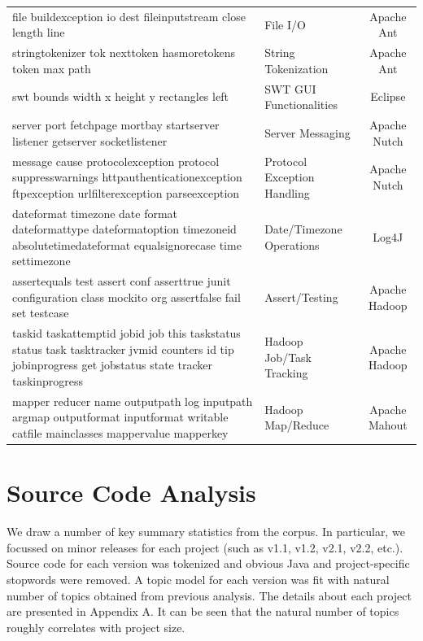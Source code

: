 \documentclass[12pt]{article}
\begin{document}
\begin{center}
\begin{longtable}{|>{\small}m{7.1cm}|>{\small}m{3cm}|>{\small}c|}
\hline
\multicolumn{1}{|c|}{Top Words} & \multicolumn{1}{|c|}{Topic} & \multicolumn{1}{|c|}{Project} \\ \hline
\endhead
file buildexception io dest fileinputstream close length line & File I/O & Apache Ant \\ \hline
stringtokenizer tok nexttoken hasmoretokens token max path & String Tokenization & Apache Ant \\ \hline
swt bounds width x height y rectangles left & SWT GUI Functionalities & Eclipse \\ \hline
server port fetchpage mortbay startserver listener getserver socketlistener & Server Messaging & Apache Nutch \\ \hline
message cause protocolexception protocol suppresswarnings httpauthenticationexception ftpexception urlfilterexception parseexception & Protocol Exception Handling & Apache Nutch \\ \hline
dateformat timezone date format dateformattype dateformatoption timezoneid absolutetimedateformat equalsignorecase time settimezone & Date/Timezone Operations & Log4J \\ \hline
assertequals test assert conf asserttrue junit configuration class mockito org assertfalse fail set testcase & Assert/Testing & Apache Hadoop \\ \hline
taskid taskattemptid jobid job this taskstatus status task tasktracker jvmid counters id tip jobinprogress get jobstatus state tracker taskinprogress & Hadoop Job/Task Tracking & Apache Hadoop \\ \hline
mapper reducer name outputpath log inputpath argmap outputformat inputformat writable catfile mainclasses mappervalue mapperkey & Hadoop Map/Reduce & Apache Mahout \\ \hline
\end{longtable}
\end{center}

\section{Source Code Analysis}\label{Source Code Analysis}
We draw a number of key summary statistics from the corpus. In particular, we focussed on minor releases for each project (such as v1.1, v1.2, v2.1, v2.2, etc.). Source code for each version was tokenized and obvious Java and project-specific stopwords were removed. A topic model for each version was fit with natural number of topics obtained from previous analysis. The details about each project are presented in Appendix A. It can be seen that the natural number of topics roughly correlates with project size.
\end{document}
